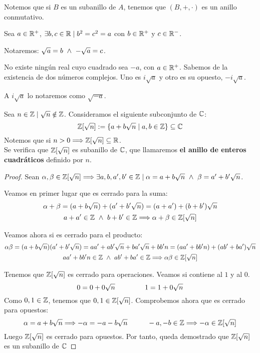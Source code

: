 Notemos que si $B$ es un subanillo de $A$, tenemos que $(B, +, \cdot)$ es un anillo conmutativo.

\begin{notacion}
     Sea $a \in \mathbb R^{+}$, $\exists b,c \in \mathbb R \mid b^2 = c^2 = a$ con $b \in \mathbb R^{+}$ y $c \in \mathbb R^{-}$.
     
     Notaremos: $\sqrt{a} = b \ \land \  -\sqrt{a}=c$. 
\end{notacion}
\begin{notacion}
    No existe ningún real cuyo cuadrado sea $-a$, con $a \in \mathbb R^{+}$. Sabemos de la existencia de dos números complejos. Uno es $i\sqrt{a}$ y otro es su opuesto, $-i\sqrt{a}$.
    
    A $i\sqrt{a}$ lo notaremos como $\sqrt{-a}$.
\end{notacion}

\begin{prop}
    \label{prop:enteros_cuadraticos}
    Sea $n \in \mathbb Z \mid \sqrt{n} \notin \mathbb Z$. Consideramos el siguiente subconjunto de $\mathbb C$:
    $$\mathbb Z[\sqrt{n}] := \{a+b\sqrt{n} \mid a,b \in \mathbb Z \} \subseteq \mathbb C$$
    Notemos que si $n >0 \Longrightarrow \mathbb Z[\sqrt{n}] \subseteq \mathbb R$.\\
    
    Se verifica que $\mathbb Z[\sqrt{n}]$ es subanillo de $\mathbb C$, que llamaremos \textbf{el anillo de enteros cuadráticos} definido por $n$.
\end{prop}
\begin{proof}
    Sean $\alpha, \beta \in \mathbb Z[\sqrt{n}] \Longrightarrow \exists a,b,a',b' \in \mathbb Z \mid \alpha = a+b\sqrt{n} \ \land \  \beta = a'+b'\sqrt{n}$.

    Veamos en primer lugar que es cerrado para la suma:
    \begin{gather*}
        \alpha + \beta = (a + b\sqrt{n})+(a'+b'\sqrt{n}) = (a+a') + (b+b')\sqrt{n} \\
        a+a' \in \mathbb Z \ \land \  b+b' \in \mathbb Z \Longrightarrow \alpha + \beta \in \mathbb Z[\sqrt{n}]
    \end{gather*}

    Veamos ahora si es cerrado para el producto:
    \begin{gather*}
        \alpha\beta = (a+b\sqrt{n})(a'+b'\sqrt{n}) = aa' + ab'\sqrt{n} + ba'\sqrt{n} + bb'n = (aa'+bb'n) + (ab'+ba') \sqrt{n} \\
        aa'+bb'n \in \mathbb Z \ \land \  ab'+ba' \in \mathbb Z \Longrightarrow \alpha\beta \in \mathbb Z[\sqrt{n}]
    \end{gather*}
    
    Tenemos que $\mathbb Z[\sqrt{n}]$ es cerrado para operaciones. Veamos si contiene al $1$ y al $0$.  
    $$0 = 0+0 \sqrt{n} \hspace{1.5cm} 1 = 1+0\sqrt{n}$$
    Como $0,1\in \mathbb Z$, tenemos que $0,1\in \mathbb Z[\sqrt{n}]$. Comprobemos ahora que es cerrado para opuestos:
    $$\alpha = a+b\sqrt{n} \Longrightarrow -\alpha = -a-b\sqrt{n} \hspace{1cm} -a,-b \in \mathbb Z \Longrightarrow -\alpha \in \mathbb Z[\sqrt{n}]$$
    Luego $\mathbb Z[\sqrt{n}]$ es cerrado para opuestos. Por tanto, queda demostrado que $\mathbb Z[\sqrt{n}]$ es un subanillo de $\mathbb C$
\end{proof}

